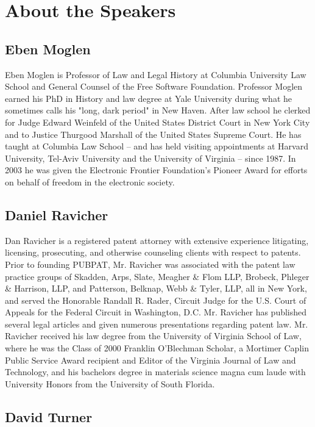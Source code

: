 \documentclass[11pt, letterpaper]{book}
\begin{document}
\chapter*{About the Speakers}

\section*{Eben Moglen}

Eben Moglen is Professor of Law and Legal History at Columbia
University Law School and General Counsel of the Free Software
Foundation. Professor Moglen earned his PhD in History and law degree
at Yale University during what he sometimes calls his "long, dark
period" in New Haven. After law school he clerked for Judge Edward
Weinfeld of the United States District Court in New York City and to
Justice Thurgood Marshall of the United States Supreme Court. He has
taught at Columbia Law School -- and has held visiting appointments at
Harvard University, Tel-Aviv University and the University of Virginia
-- since 1987. In 2003 he was given the Electronic Frontier
Foundation's Pioneer Award for efforts on behalf of freedom in the
electronic society.

\section*{Daniel Ravicher}

Dan Ravicher is a registered patent attorney with extensive experience
litigating, licensing, prosecuting, and otherwise counseling clients
with respect to patents. Prior to founding PUBPAT, Mr. Ravicher was
associated with the patent law practice groups of Skadden, Arps,
Slate, Meagher \& Flom LLP, Brobeck, Phleger \& Harrison, LLP, and
Patterson, Belknap, Webb \& Tyler, LLP, all in New York, and served the
Honorable Randall R. Rader, Circuit Judge for the U.S. Court of
Appeals for the Federal Circuit in Washington, D.C.  Mr. Ravicher has
published several legal articles and given numerous presentations
regarding patent law.  Mr. Ravicher received his law degree from the
University of Virginia School of Law, where he was the Class of 2000
Franklin O'Blechman Scholar, a Mortimer Caplin Public Service Award
recipient and Editor of the Virginia Journal of Law and Technology,
and his bachelors degree in materials science magna cum laude with
University Honors from the University of South Florida.

\section*{David Turner}
\end{document}
